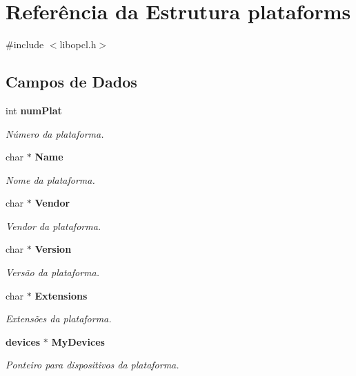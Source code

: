\section{Referência da Estrutura plataforms}
\label{structplataforms}


{\ttfamily \#include $<$libopcl.\+h$>$}

\subsection*{Campos de Dados}
\begin{DoxyCompactItemize}
\item 
\mbox{\label{structplataforms_a8cc0a7307d1088b3be86bad8514a85a3}} 
int \textbf{ num\+Plat}
\begin{DoxyCompactList}\small\item\em Número da plataforma. \end{DoxyCompactList}\item 
\mbox{\label{structplataforms_a5e6182c030324511dd82e9fa1a0ab071}} 
char $\ast$ \textbf{ Name}
\begin{DoxyCompactList}\small\item\em Nome da plataforma. \end{DoxyCompactList}\item 
\mbox{\label{structplataforms_a3edc9ba9f59b30aa97a8d6d258caa80f}} 
char $\ast$ \textbf{ Vendor}
\begin{DoxyCompactList}\small\item\em Vendor da plataforma. \end{DoxyCompactList}\item 
\mbox{\label{structplataforms_abc057f42fdaf5e63835a8272aefe278e}} 
char $\ast$ \textbf{ Version}
\begin{DoxyCompactList}\small\item\em Versão da plataforma. \end{DoxyCompactList}\item 
\mbox{\label{structplataforms_a04797e250a09482a400749add9f8862e}} 
char $\ast$ \textbf{ Extensions}
\begin{DoxyCompactList}\small\item\em Extensões da plataforma. \end{DoxyCompactList}\item 
\mbox{\label{structplataforms_adcd439f5e569e26a6614e6ab344d72d2}} 
\textbf{ devices} $\ast$ \textbf{ My\+Devices}
\begin{DoxyCompactList}\small\item\em Ponteiro para dispositivos da plataforma. \end{DoxyCompactList}\end{DoxyCompactItemize}


